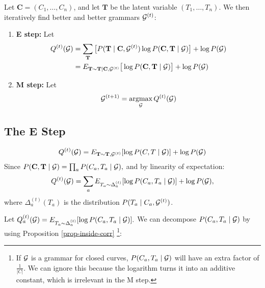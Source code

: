 \documentclass{article}
\begin{document}
Let $\mathbf{C} = (C_1,\dots,C_n)$, and let $\mathbf{T}$ be the latent
variable $(T_1,\dots,T_n)$. We then iteratively find better and better
grammars ${\mathcal G}^{(t)}$:
\begin{enumerate}
\item \textbf{E step:} Let 
  \begin{align*}
Q^{(t)}({\mathcal G}) &= \sum_{\mathbf{T}} \big[P(\mathbf{T}\mid \mathbf{C},
{\mathcal G}^{(t)}) \log P(\mathbf{C},\mathbf{T}\mid {\mathcal G}) \big] + \log
P({\mathcal G})\\
&= E_{\mathbf{T} \sim \mathbf{T} | \mathbf{C}, {\mathcal G}^{(t)}}\big[\log
P(\mathbf{C},\mathbf{T}\mid {\mathcal G}) \big] + \log P({\mathcal G})
  \end{align*}
\item \textbf{M step:} Let
$$ {\mathcal G}^{(t+1)} = \operatorname*{argmax}_{{\mathcal G}} Q^{(t)}({\mathcal G})$$
\end{enumerate}

\subsection{The E Step}

$$Q^{(t)}({\mathcal G}) = E_{\mathbf{T}\sim \mathbf{T}, {\mathcal G}^{(t)}} [\log
P(C,T\mid {\mathcal G})] + \log P({\mathcal G})$$
Since $P(\mathbf{C},\mathbf{T}\mid {\mathcal G}) = \prod_a P(C_a, T_a\mid {\mathcal G}),$
and by linearity of expectation:
$$Q^{(t)}({\mathcal G}) = \sum_a E_{T_a\sim \Delta^{(t)}_a} [\log
P(C_a,T_a \mid {\mathcal G})] + \log P({\mathcal G}),$$
where $\Delta^{(t)}_a(T_a)$ is the distribution $P(T_a\mid C_a,
{\mathcal G}^{(t)})$.

Let $Q_a^{(t)}({\mathcal G}) =E_{T_a \sim \Delta_a^{(t)}}[\log P(C_a,T_a\mid
{\mathcal G})].$ We can decompose $P(C_a, T_a\mid {\mathcal G})$ by using Proposition
\ref{prop-inside-corr} \footnote{If ${\mathcal G}$ is a grammar for closed curves,
  $P(C_a,T_a\mid {\mathcal G})$ will have an extra factor of
  $\frac{1}{|C|}$. We can ignore this because the logarithm turns it
  into an additive constant, which is irrelevant in the M step.}:
\end{document}
